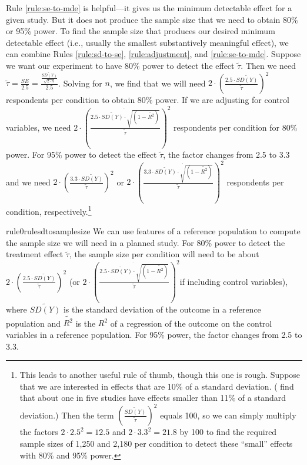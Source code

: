 \documentclass[12pt]{article}
\begin{document}
Rule \ref{rule:se-to-mde} is helpful---it gives us the minimum detectable effect for a given study.
But it does not produce the sample size that we need to obtain 80\% or 95\% power. 
To find the sample size that produces our desired minimum detectable effect (i.e., usually the smallest substantively meaningful effect), we can combine Rules \ref{rule:sd-to-se}, \ref{rule:adjustment}, and \ref{rule:se-to-mde}. 
Suppose we want our experiment to have 80\% power to detect the effect $\widetilde{\tau}$.
Then we need $\widetilde{\tau} = \frac{SE}{2.5} = \frac{\frac{\widetilde{SD(Y)}}{\sqrt{2 \cdot n}}}{2.5}$.
Solving for $n$, we find that we will need $2 \cdot \left( \frac{2.5 \cdot \widetilde{SD(Y)}}{\widetilde{\tau}} \right)^{2}$ respondents per condition to obtain 80\% power. 
If we are adjusting for control variables, we need $2 \cdot \left( \frac{\dot{2.5 \cdot \widetilde{SD(Y)} \cdot \sqrt{\left( 1 - \widetilde{R^{2}} \right)}}}{\widetilde{\tau}} \right)^{2}$ respondents per condition for 80\% power. For 95\% power to detect the effect $\widetilde{\tau}$, the factor changes from 2.5 to 3.3 and we need $2 \cdot \left( \frac{3.3 \cdot \widetilde{SD(Y)}}{\widetilde{\tau}} \right)^{2}$ or $2 \cdot \left( \frac{3.3 \cdot \dot{\widetilde{SD(Y)} \cdot \sqrt{\left( 1 - \widetilde{R^2} \right)}}}{\widetilde{\tau}} \right)^{2}$ respondents per condition, respectively.\footnote{
  This leads to another useful rule of thumb, though this one is rough. 
  Suppose that we are interested in effects that are 10\% of a standard deviation. 
  (\cite{Lovakov2021} find that about one in five studies have effects smaller than 11\% of a standard deviation.)
  Then the term $\left( \frac{\widetilde{SD(Y)}}{\widetilde{\tau}} \right)^{2}$ equals 100, so we can simply multiply the factors $2 \cdot {2.5}^{2} = 12.5$ and $2 \cdot {3.3}^{2} = 21.8$ by 100 to find the required sample sizes of 1,250 and 2,180 per condition to detect these ``small'' effects with 80\% and 95\% power.
  }

\begin{restatable}{rule0}{rulesdtosamplesize}
\label{rule:sd-to-sample-size}
We can use features of a reference population to compute the sample size we will need in a planned study. 
For 80\% power to detect the treatment effect $\widetilde{\tau}$, the sample size per condition will need to be about $2 \cdot \left( \frac{2.5 \cdot \widetilde{SD(Y)}}{\widetilde{\tau}} \right)^{2}$ (or $2 \cdot \left( \frac{\dot{2.5 \cdot \widetilde{SD(Y)} \cdot \sqrt{\left( 1 - \widetilde{R^{2}} \right)}}}{\widetilde{\tau}} \right)^{2}$if including control variables), where $\widetilde{SD(Y)}$ is the standard deviation of the outcome in a reference population and $\widetilde{R^2}$ is the $R^2$ of a regression of the outcome on the control variables in a reference population.
For 95\% power, the factor changes from 2.5 to 3.3.
\end{restatable}
\end{document}
